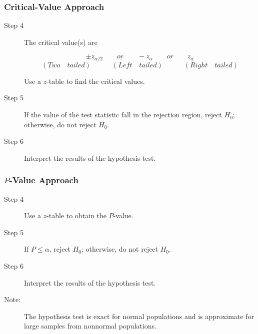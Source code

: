\documentclass[12pt]{article}
\begin{document}
            \subsubsection*{Critical-Value Approach}
                \begin{description}
                    \item[Step 4] The critical value(s) are
                    \begin{center}
                        \[
                            \pm z _{\alpha/2} \quad\quad or \quad\quad -z_{\alpha} \quad\quad or
                            \quad\quad z_{\alpha}     
                        \]
                        \[
                            (Two \quad tailed)\quad\quad\quad(Left \quad tailed)\quad\quad\quad
                            (Right \quad tailed)
                        \]
                    \end{center} 
                    Use a $z$-table to find the critical values.
                    \item[Step 5] If the value of the test statistic fall in the rejection
                    region, reject $H_0$; otherwise, do not reject $H_0$.
                    \item[Step 6] Interpret the results of the hypothesis test. 
                \end{description}
            \subsubsection*{$P$-Value Approach}
                \begin{description}
                    \item[Step 4] Use a $z$-table to obtain the $P$-value.
                    \item[Step 5] If $P \leq \alpha$, reject $H_0$; otherwise, do not reject
                    $H_0$.
                    \item[Step 6] Interpret the results of the hypothesis test.
                    \item[Note:] The hypothesis test is exact for normal populations and is
                    approximate for large samples from nonnormal populations.  
                \end{description}
\end{document}
